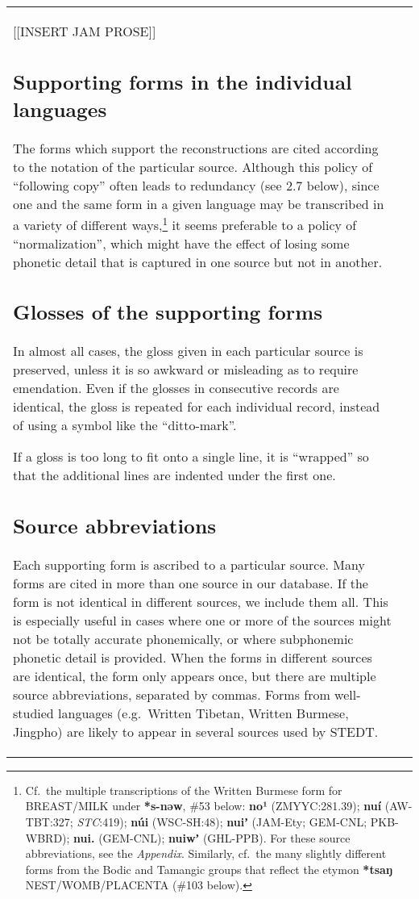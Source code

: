 \begin{itemize}
\begin{tabular}{l l}
[[INSERT JAM PROSE]]

\subsection{Supporting forms in the individual languages}


The forms which support the reconstructions are cited according to the
notation of the particular source.  Although this policy of “following copy”
often leads to redundancy (see 2.7 below), since one and the same form in a
given language may be transcribed in a variety of different ways,\footnote{Cf.\ the
multiple transcriptions of the Written Burmese form for BREAST/MILK under
\textbf{*s-nəw}, \#53 below:  \textbf{no¹}
(ZMYYC:281.39); \textbf{nuí} (AW-TBT:327; \textit{STC}:419); \textbf{núi}
(WSC-SH:48); \textbf{nuiʼ} (JAM-Ety; GEM-CNL; PKB-WBRD);
\textbf{nui.} (GEM-CNL); \textbf{nuiwʼ} (GHL-PPB).
 For these source abbreviations, see the \textit{Appendix}. Similarly, cf.\ the many slightly different forms from the Bodic and Tamangic groups that reflect the etymon \textbf{*tsaŋ} NEST/WOMB/PLACENTA (\#103 below).} it seems preferable to a
policy of “normalization”, which might have the effect of losing some phonetic
detail that is captured in one source but not in another.

\subsection{Glosses of the supporting forms}


In almost all cases, the gloss given in each particular source is preserved,
unless it is so awkward or misleading as to require emendation.  Even if the
glosses in consecutive records are identical, the gloss is repeated for each
individual record, instead of using a symbol like the “ditto-mark”.  


If a gloss is too long to fit onto a single line, it is “wrapped” so that
the additional lines are indented under the first one.

\subsection{Source abbreviations}


Each supporting form is ascribed to a particular source.  Many forms are
cited in more than one source in our database.  If the form is not identical in
different sources, we include them all.  This is especially useful in cases
where one or more of the sources might not be totally accurate phonemically, or
where subphonemic phonetic detail is provided. When the forms in different
sources are identical, the form only appears once, but there are multiple source
abbreviations, separated by commas.  Forms from well-studied languages
(e.g.\ Written Tibetan, Written Burmese, Jingpho) are likely to appear in several
sources used by STEDT.



\end{tabular}
\end{itemize}
